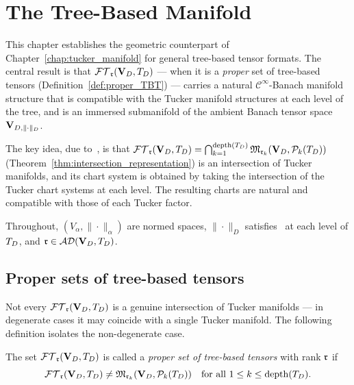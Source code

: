 %
%

\chapter{The Tree-Based Manifold}
\label{chap:TB_manifold}

This chapter establishes the geometric counterpart of
Chapter~\ref{chap:tucker_manifold} for general tree-based tensor
formats. The central result is that $\mathcal{FT}_{\mathfrak{r}}(\mathbf{V}_D,T_D)$ — when it is a
\emph{proper} set of tree-based tensors (Definition~\ref{def:proper_TBT})
— carries a natural $\mathcal{C}^\infty$-Banach manifold structure
that is compatible with the Tucker manifold structures at each
level of the tree, and is an immersed submanifold of the ambient
Banach tensor space $\mathbf{V}_{D,\|\cdot\|_D}$.

The key idea, due to~\cite{FHN2023}, is that
$\mathcal{FT}_{\mathfrak{r}}(\mathbf{V}_D,T_D) = \bigcap_{k=1}^{\mathrm{depth}(T_D)} \mathfrak{M}_{\mathfrak{r}_k}(\mathbf{V}_D, \mathcal{P}_{k}(T_D))$
(Theorem~\ref{thm:intersection_representation}) is an intersection of
Tucker manifolds, and its chart system is obtained by taking the
intersection of the Tucker chart systems at each level. The resulting
charts are natural and compatible with those of each Tucker factor.

Throughout, $(V_\alpha, \|\cdot\|_\alpha)$ are normed spaces,
$\|\cdot\|_D$ satisfies \condINJ\ at each level of $T_D$, and
$\mathfrak{r} \in \mathcal{AD}(\mathbf{V}_D,T_D)$.

\section{Proper sets of tree-based tensors}
\label{sec:TB_manifold:proper}

Not every $\mathcal{FT}_{\mathfrak{r}}(\mathbf{V}_D,T_D)$ is a genuine intersection of Tucker manifolds — in
degenerate cases it may coincide with a single Tucker manifold.
The following definition isolates the non-degenerate case.

\begin{definition}
\label{def:proper_TBT}
The set $\mathcal{FT}_{\mathfrak{r}}(\mathbf{V}_D,T_D)$ is called a \emph{proper set of tree-based tensors}
with rank $\mathfrak{r}$ if
\begin{equation*}
    \mathcal{FT}_{\mathfrak{r}}(\mathbf{V}_D,T_D) \neq \mathfrak{M}_{\mathfrak{r}_k}(\mathbf{V}_D, \mathcal{P}_{k}(T_D))
    \quad \text{for all } 1 \leq k \leq \mathrm{depth}(T_D).
\end{equation*}
\end{definition}

